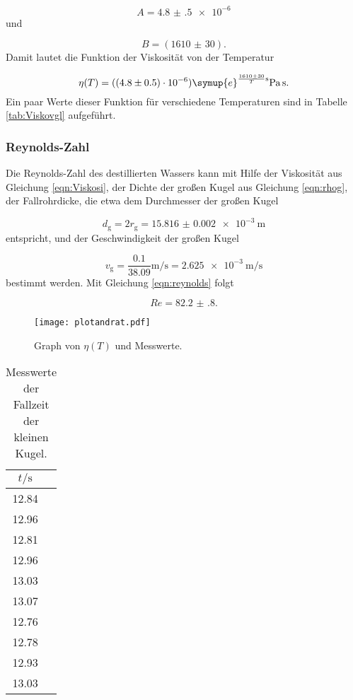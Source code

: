 \begin{equation}
  A = \num{4.8(5)e-6}
\end{equation}
und

\begin{equation}
  B = (\num{1610(30)}).
\end{equation}
Damit lautet die Funktion der Viskosität von der Temperatur

\begin{equation}
  \eta(T) = (\num{4.8(5)e-6}) \symup{e}^{\frac{\num{1610(30)}}{T}\si{\second}}
  \si{\pascal\second}.
\end{equation}
Ein paar Werte dieser Funktion für verschiedene Temperaturen sind in
Tabelle \ref{tab:Viskovgl} aufgeführt.

\subsubsection{Reynolds-Zahl}

Die Reynolds-Zahl des destillierten Wassers kann mit Hilfe der Viskosität aus
Gleichung \eqref{eqn:Viskosi}, der Dichte der großen Kugel aus Gleichung
\eqref{eqn:rhog},
der Fallrohrdicke, die etwa dem Durchmesser der großen Kugel

\begin{equation}
  d_\text{g} = 2 r_\text{g} = \SI{15.816(2)e-3}{\meter}
\end{equation}
entspricht, und der Geschwindigkeit der großen Kugel

\begin{equation}
  v_\text{g} = \frac{0.1}{38.09}\si{\meter\per\second} =
  \SI{2.625e-3}{\meter\per\second}
\end{equation}
bestimmt werden.
Mit Gleichung \eqref{eqn:reynolds} folgt

\begin{equation}
  Re = \num{82.2(8)}.
\end{equation}

\begin{figure}
  \centering
  \texttt{[image: plotandrat.pdf]}
  \caption{Graph von $\eta(T)$ und Messwerte.}
  \label{fig:VisTemp}
\end{figure}

\begin{table}[h]
  \centering
  \caption{Messwerte der Fallzeit der kleinen Kugel.}
  \label{tab:klKugel}
  \begin{tabular}{c c}
    \toprule
    $t/\si{\second}$ \\
    \midrule
    12.84 \\
    12.96 \\
    12.81 \\
    12.96 \\
    13.03 \\
    13.07 \\
    12.76 \\
    12.78 \\
    12.93 \\
    13.03 \\
    \bottomrule
  \end{tabular}
\end{table}

